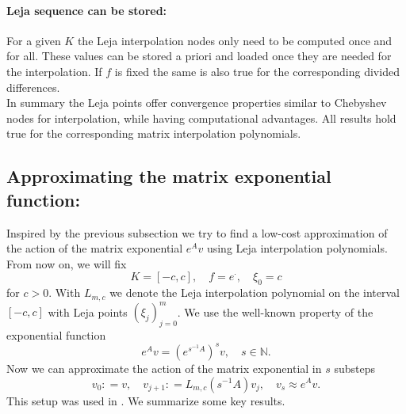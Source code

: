 \documentclass{scrartcl}
\newcommand{\defneq}{\mathrel{\mathop:}=}
\begin{document}
\paragraph{Leja sequence can be stored:}
For a given $K$ the Leja interpolation nodes only need to be computed once and for all. These values can be stored a priori and loaded once they are needed for the interpolation. If $f$ is fixed the same is also true for the corresponding divided differences. \\

In summary the Leja points offer convergence properties similar to Chebyshev nodes for interpolation, while having computational advantages. All results hold true for the corresponding matrix interpolation polynomials.

\subsection{Approximating the matrix exponential function:}
Inspired by the previous subsection we try to find a low-cost approximation of the action of the matrix exponential $e^Av$ using Leja interpolation polynomials. From now on, we will fix 
\[K=[-c,c], \quad f = e^\cdot, \quad \xi_0 = c \]
for $c>0$. With $L_{m,c}$ we denote the Leja interpolation polynomial on the interval $[-c,c]$ with Leja points $(\xi_j)_{j=0}^{m}$. We use the well-known property of the exponential function
\[e^Av = (e^{s^{-1}A})^sv, \quad s\in\mathbb{N}.\]
Now we can approximate the action of the matrix exponential in $s$ substeps
\[v_0\defneq v,\quad v_{j+1}\defneq L_{m,c}(s^{-1}A)v_j,\quad v_s \approx e^Av.\]
This setup was used in \cite{lejarev}. We summarize some key results. 
\end{document}

